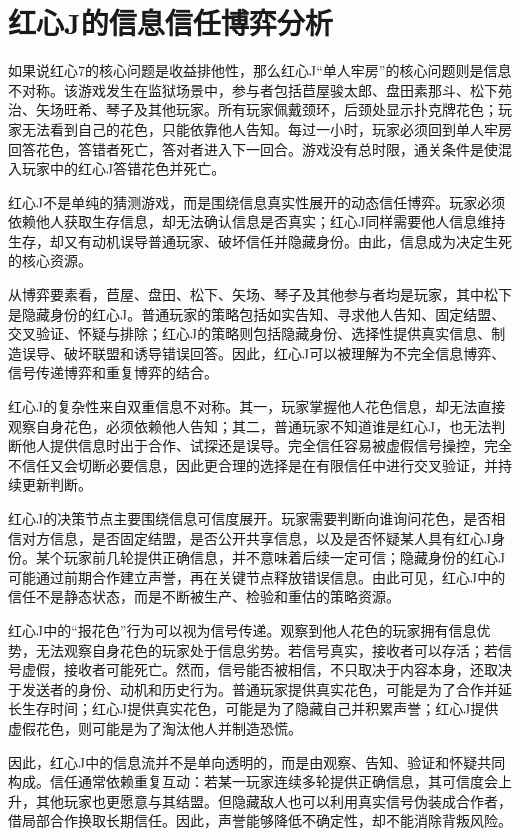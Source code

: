 \documentclass{article}
\begin{document}
\section{红心J的信息信任博弈分析}

如果说红心7的核心问题是收益排他性，那么红心J“单人牢房”的核心问题则是信息不对称。该游戏发生在监狱场景中，参与者包括苣屋骏太郎、盘田素那斗、松下苑治、矢场旺希、琴子及其他玩家。所有玩家佩戴颈环，后颈处显示扑克牌花色；玩家无法看到自己的花色，只能依靠他人告知。每过一小时，玩家必须回到单人牢房回答花色，答错者死亡，答对者进入下一回合。游戏没有总时限，通关条件是使混入玩家中的红心J答错花色并死亡。

红心J不是单纯的猜测游戏，而是围绕信息真实性展开的动态信任博弈。玩家必须依赖他人获取生存信息，却无法确认信息是否真实；红心J同样需要他人信息维持生存，却又有动机误导普通玩家、破坏信任并隐藏身份。由此，信息成为决定生死的核心资源。

从博弈要素看，苣屋、盘田、松下、矢场、琴子及其他参与者均是玩家，其中松下是隐藏身份的红心J。普通玩家的策略包括如实告知、寻求他人告知、固定结盟、交叉验证、怀疑与排除；红心J的策略则包括隐藏身份、选择性提供真实信息、制造误导、破坏联盟和诱导错误回答。因此，红心J可以被理解为不完全信息博弈、信号传递博弈和重复博弈的结合。

红心J的复杂性来自双重信息不对称。其一，玩家掌握他人花色信息，却无法直接观察自身花色，必须依赖他人告知；其二，普通玩家不知道谁是红心J，也无法判断他人提供信息时出于合作、试探还是误导。完全信任容易被虚假信号操控，完全不信任又会切断必要信息，因此更合理的选择是在有限信任中进行交叉验证，并持续更新判断。

红心J的决策节点主要围绕信息可信度展开。玩家需要判断向谁询问花色，是否相信对方信息，是否固定结盟，是否公开共享信息，以及是否怀疑某人具有红心J身份。某个玩家前几轮提供正确信息，并不意味着后续一定可信；隐藏身份的红心J可能通过前期合作建立声誉，再在关键节点释放错误信息。由此可见，红心J中的信任不是静态状态，而是不断被生产、检验和重估的策略资源。

红心J中的“报花色”行为可以视为信号传递。观察到他人花色的玩家拥有信息优势，无法观察自身花色的玩家处于信息劣势。若信号真实，接收者可以存活；若信号虚假，接收者可能死亡。然而，信号能否被相信，不只取决于内容本身，还取决于发送者的身份、动机和历史行为。普通玩家提供真实花色，可能是为了合作并延长生存时间；红心J提供真实花色，可能是为了隐藏自己并积累声誉；红心J提供虚假花色，则可能是为了淘汰他人并制造恐慌。

因此，红心J中的信息流并不是单向透明的，而是由观察、告知、验证和怀疑共同构成。信任通常依赖重复互动：若某一玩家连续多轮提供正确信息，其可信度会上升，其他玩家也更愿意与其结盟。但隐藏敌人也可以利用真实信号伪装成合作者，借局部合作换取长期信任。因此，声誉能够降低不确定性，却不能消除背叛风险。
\end{document}

